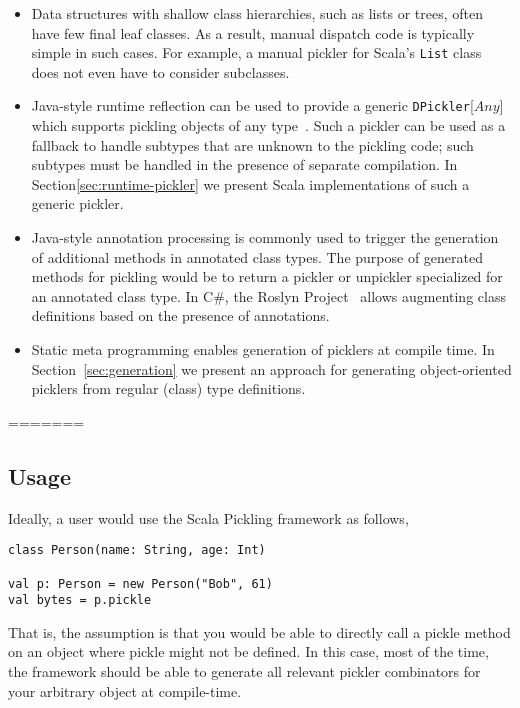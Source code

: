 \documentclass[preprint,10pt]{sigplanconf}
\theoremstyle{definition}
\newcommand{\term}[1]{\mbox{\texttt{#1}}}
\begin{document}
\begin{itemize}
\item Data structures with shallow class hierarchies, such as lists or trees,
often have few final leaf classes. As a result, manual dispatch code is
typically simple in such cases. For example, a manual pickler for Scala's
\term{List} class does not even have to consider subclasses.

\item Java-style runtime reflection can be used to provide a generic
\term{DPickler}[$Any$] which supports pickling objects of any
type~\cite{JavaSerialization,Philippsen2000}. Such a pickler can be used as a
fallback to handle subtypes that are unknown to the pickling code; such
subtypes must be handled in the presence of separate compilation. In
Section\ref{sec:runtime-pickler} we present Scala implementations of such a
generic pickler.

\item Java-style annotation processing is commonly used to trigger the
generation of additional methods in annotated class types. The purpose of
generated methods for pickling would be to return a pickler or unpickler
specialized for an annotated class type. In C#, the Roslyn
Project~\cite{Roslyn} allows augmenting class definitions based on the
presence of annotations.

\item Static meta programming \cite{Burmako2012,Nemerle} enables generation of
picklers at compile time. In Section~\ref{sec:generation} we present an
approach for generating object-oriented picklers from regular (class) type
definitions.
\end{itemize}

=======

\subsection{Usage}

Ideally, a user would use the Scala Pickling framework as follows,

\begin{verbatim}
class Person(name: String, age: Int)

val p: Person = new Person("Bob", 61)
val bytes = p.pickle
\end{verbatim}\noindent

That is, the assumption is that you would be able to directly call a
pickle method on an object where pickle might not be defined. In this
case, most of the time, the framework should be able to generate all
relevant pickler combinators for your arbitrary object at
compile-time.
\end{document}

